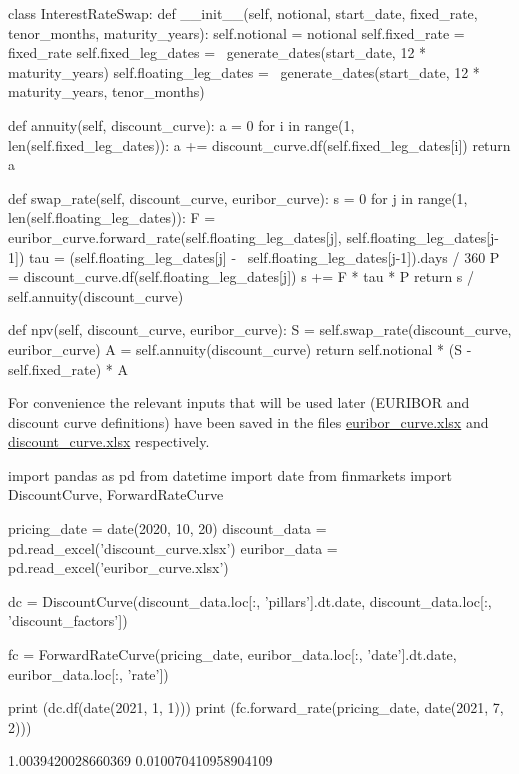 \begin{ipython}
class InterestRateSwap:
    def __init__(self, notional, start_date, fixed_rate,
                 tenor_months, maturity_years):
        self.notional = notional
        self.fixed_rate = fixed_rate
        self.fixed_leg_dates = \
            generate_dates(start_date, 12 * maturity_years)
        self.floating_leg_dates = \
            generate_dates(start_date, 12 * maturity_years, tenor_months)
    
    def annuity(self, discount_curve):
        a = 0
        for i in range(1, len(self.fixed_leg_dates)):
            a += discount_curve.df(self.fixed_leg_dates[i])
        return a

    def swap_rate(self, discount_curve, euribor_curve):
        s = 0
        for j in range(1, len(self.floating_leg_dates)):
            F = euribor_curve.forward_rate(self.floating_leg_dates[j], self.floating_leg_dates[j-1])
            tau = (self.floating_leg_dates[j] - \
                self.floating_leg_dates[j-1]).days / 360 
            P = discount_curve.df(self.floating_leg_dates[j])
            s += F * tau * P
        return s / self.annuity(discount_curve)

    def npv(self, discount_curve, euribor_curve):
        S = self.swap_rate(discount_curve, euribor_curve)
        A = self.annuity(discount_curve)
        return self.notional * (S - self.fixed_rate) * A
\end{ipython}

For convenience the relevant inputs that will be used later (EURIBOR and discount curve definitions) have been saved in the files  \href{https://github.com/matteosan1/finance_course/raw/develop/libro/input_files/libor_curve.xlsx}{euribor\_curve.xlsx} and \href{https://github.com/matteosan1/finance_course/raw/develop/libro/input_files/discount_curve.xlsx}{discount\_curve.xlsx} respectively.

\begin{ipython}
import pandas as pd
from datetime import date
from finmarkets import DiscountCurve, ForwardRateCurve

pricing_date = date(2020, 10, 20)
discount_data = pd.read_excel('discount_curve.xlsx')
euribor_data = pd.read_excel('euribor_curve.xlsx')

dc = DiscountCurve(discount_data.loc[:, 'pillars'].dt.date,
                   discount_data.loc[:, 'discount_factors'])
                   
fc = ForwardRateCurve(pricing_date, 
                      euribor_data.loc[:, 'date'].dt.date,
                      euribor_data.loc[:, 'rate'])

print (dc.df(date(2021, 1, 1)))
print (fc.forward_rate(pricing_date, date(2021, 7, 2)))
\end{ipython}
\begin{ioutput}
1.0039420028660369
0.010070410958904109
\end{ioutput}

